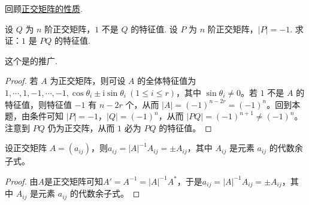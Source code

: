 \documentclass[../../main.tex]{subfiles}
\begin{document}
回顾\hyperref[theorem:正交矩阵的基本性质1]{正交矩阵的性质}.

\begin{proposition}\label{proposition:例9.44的推广}
设 \(Q\) 为 \(n\) 阶正交矩阵，\(1\) 不是 \(Q\) 的特征值. 设 \(P\) 为 \(n\) 阶正交矩阵，\(\vert P\vert = - 1\). 求证：\(1\) 是 \(PQ\) 的特征值.
\end{proposition}
\begin{remark}
这个是的推广.
\end{remark}
\begin{proof}
若 \(A\) 为正交矩阵，则可设 \(A\) 的全体特征值为 \(1,\cdots,1,-1,\cdots,-1,\cos\theta_i\pm\mathrm{i}\sin\theta_i\ (1\leqslant  i \leqslant  r)\)，其中 \(\sin\theta_i\neq0\)。若 \(1\) 不是 \(A\) 的特征值，则特征值 \(-1\) 有 \(n - 2r\) 个，从而 \(\vert A\vert = (-1)^{n - 2r}=(-1)^n\)。回到本题，由条件可知 \(\vert P\vert = - 1\)，\(\vert Q\vert = (-1)^n\)，从而 \(\vert PQ\vert = (-1)^{n + 1}\neq(-1)^n\)。注意到 \(PQ\) 仍为正交阵，从而 \(1\) 必为 \(PQ\) 的特征值。
\end{proof}

\begin{proposition}\label{proposition:正交阵元素的性质}
设正交矩阵 \(A = (a_{ij})\)，则\(a_{ij} = \vert A\vert^{-1}A_{ij} = \pm A_{ij}\)，其中 \(A_{ij}\) 是元素 \(a_{ij}\) 的代数余子式。
\end{proposition}
\begin{proof}
由$A$是正交矩阵可知\(A' = A^{-1} = \vert A\vert^{-1}A^*\)，于是\(a_{ij} = \vert A\vert^{-1}A_{ij} = \pm A_{ij}\)，其中 \(A_{ij}\) 是元素 \(a_{ij}\) 的代数余子式。
\end{proof}
\end{document}
